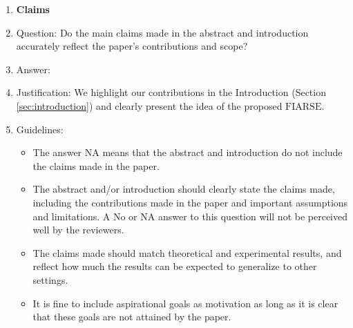 \documentclass{article}
\theoremstyle{plain}
\theoremstyle{definition}
\theoremstyle{remark}
\newcommand{\algo}{\ensuremath{\text{FIARSE}}\xspace}
\begin{document}
 



\begin{enumerate}

\item {\bf Claims}
    \item[] Question: Do the main claims made in the abstract and introduction accurately reflect the paper's contributions and scope?
    \item[] Answer: \answerYes{} %
    \item[] Justification: We highlight our contributions in the Introduction (Section \ref{sec:introduction}) and clearly present the idea of the proposed \algo. 
    \item[] Guidelines:
    \begin{itemize}
        \item The answer NA means that the abstract and introduction do not include the claims made in the paper.
        \item The abstract and/or introduction should clearly state the claims made, including the contributions made in the paper and important assumptions and limitations. A No or NA answer to this question will not be perceived well by the reviewers. 
        \item The claims made should match theoretical and experimental results, and reflect how much the results can be expected to generalize to other settings. 
        \item It is fine to include aspirational goals as motivation as long as it is clear that these goals are not attained by the paper. 
    \end{itemize}


\end{enumerate}
\end{document}
